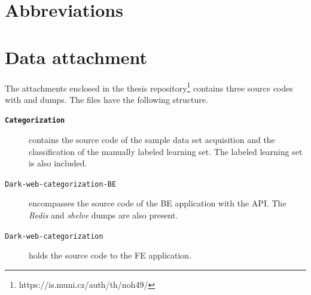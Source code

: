 \appendixpageoff
\begin{appendices}

\chapter{Abbreviations}
\begin{description}
    \item[]
    \item[]
    \item[]
    \item[]
\end{description}

\chapter{Data attachment}
The attachments enclosed in the thesis repository\footnote{https://is.muni.cz/auth/th/noh49/} contains three source codes with and dumps. The files have the following structure.
\begin{description}
    \item[\textbf{\texttt{Categorization}}] contains the source code of the sample data set acquisition and the classification of the manually labeled learning set. The labeled learning set is also included.
    \item [\texttt{Dark-web-categorization-BE}] encompasses the source code of the BE application with the API. The \textit{Redis} and \textit{shelve} dumps are also present.
    \item [\texttt{Dark-web-categorization}] holds the source code to the FE application. 
\end{description}




\end{appendices}
